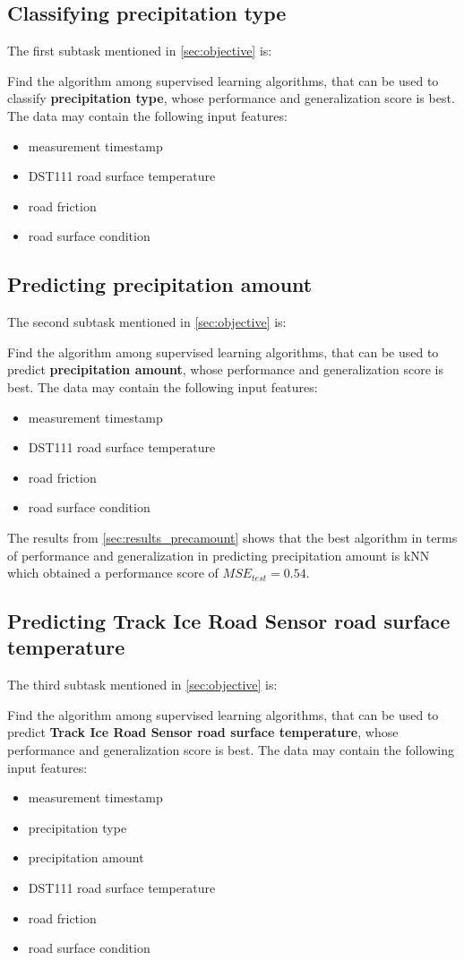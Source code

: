 	\subsection{Classifying precipitation type}
		The first subtask mentioned in \ref{sec:objective} is:
	
	Find the algorithm among supervised learning algorithms, that can be used to classify \textbf{precipitation type}, whose performance and generalization score is best. The data may contain the following input features: 
			\begin{itemize}
				\item measurement timestamp
				\item DST111 road surface temperature
				\item road friction
				\item road surface condition
			\end{itemize}

	\subsection{Predicting precipitation amount}
		The second subtask mentioned in \ref{sec:objective} is:
	
	Find the algorithm among supervised learning algorithms, that can be used to predict \textbf{precipitation amount}, whose performance and generalization score is best. The data may contain the following input features: 
			\begin{itemize}
				\item measurement timestamp
				\item DST111 road surface temperature
				\item road friction
				\item road surface condition
			\end{itemize}

	The results from \ref{sec:results_precamount} shows that the best algorithm in terms of performance and generalization in predicting precipitation amount is kNN which obtained a performance score of $MSE_{test} = 0.54$.

	\subsection{Predicting Track Ice Road Sensor road surface temperature}
		The third subtask mentioned in \ref{sec:objective} is:
	
	Find the algorithm among supervised learning algorithms, that can be used to predict \textbf{Track Ice Road Sensor road surface temperature}, whose performance and generalization score is best. The data may contain the following input features: 
			\begin{itemize}
				\item measurement timestamp
				\item precipitation type
				\item precipitation amount
				\item DST111 road surface temperature
				\item road friction
				\item road surface condition
			\end{itemize}

